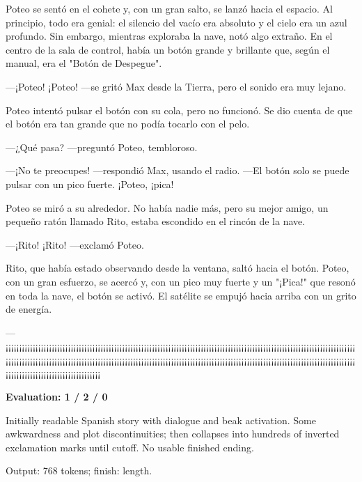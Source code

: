 \documentclass[10pt]{article}
\begin{document}
{\begin{minipage}{\textwidth}
\par\smallskip
Poteo se sentó en el cohete y, con un gran salto, se lanzó hacia el espacio. Al principio, todo era genial: el silencio del vacío era absoluto y el cielo era un azul profundo. Sin embargo, mientras exploraba la nave, notó algo extraño. En el centro de la sala de control, había un botón grande y brillante que, según el manual, era el "Botón de Despegue".
\par\smallskip
—¡Poteo! ¡Poteo! —se gritó Max desde la Tierra, pero el sonido era muy lejano.
\par\smallskip
Poteo intentó pulsar el botón con su cola, pero no funcionó. Se dio cuenta de que el botón era tan grande que no podía tocarlo con el pelo.
\par\smallskip
—¿Qué pasa? —preguntó Poteo, tembloroso.
\par\smallskip
—¡No te preocupes! —respondió Max, usando el radio. —El botón solo se puede pulsar con un pico fuerte. ¡Poteo, ¡pica!
\par\smallskip
Poteo se miró a su alrededor. No había nadie más, pero su mejor amigo, un pequeño ratón llamado Rito, estaba escondido en el rincón de la nave.
\par\smallskip
—¡Rito! ¡Rito! —exclamó Poteo.
\par\smallskip
Rito, que había estado observando desde la ventana, saltó hacia el botón. Poteo, con un gran esfuerzo, se acercó y, con un pico muy fuerte y un "¡Pica!" que resonó en toda la nave, el botón se activó. El satélite se empujó hacia arriba con un grito de energía.
\par\smallskip
—¡¡¡¡¡¡¡¡¡¡¡¡¡¡¡\allowbreak{}¡¡¡¡¡¡¡¡¡¡¡¡¡¡¡¡\allowbreak{}¡¡¡¡¡¡¡¡¡¡¡¡¡¡¡¡\allowbreak{}¡¡¡¡¡¡¡¡¡¡¡¡¡¡¡¡\allowbreak{}¡¡¡¡¡¡¡¡¡¡¡¡¡¡¡¡\allowbreak{}¡¡¡¡¡¡¡¡¡¡¡¡¡¡¡¡\allowbreak{}¡¡¡¡¡¡¡¡¡¡¡¡¡¡¡¡\allowbreak{}¡¡¡¡¡¡¡¡¡¡¡¡¡¡¡¡\allowbreak{}¡¡¡¡¡¡¡¡¡¡¡¡¡¡¡¡\allowbreak{}¡¡¡¡¡¡¡¡¡¡¡¡¡¡¡¡\allowbreak{}¡¡¡¡¡¡¡¡¡¡¡¡¡¡¡¡\allowbreak{}¡¡¡¡¡¡¡¡¡¡¡¡¡¡¡¡\allowbreak{}¡¡¡¡¡¡¡¡¡¡¡¡¡¡¡¡\allowbreak{}¡¡¡¡¡¡¡¡¡¡¡¡¡¡¡¡\allowbreak{}¡¡¡¡¡¡¡¡¡¡¡¡¡¡¡¡\allowbreak{}¡¡¡¡¡¡¡¡¡¡¡¡¡¡¡¡\allowbreak{}¡¡¡¡¡¡¡¡¡¡¡¡¡¡¡¡\allowbreak{}¡¡¡¡¡¡¡¡¡¡¡¡¡¡¡¡\allowbreak{}¡¡¡¡¡¡\par\smallskip
\textbf{Evaluation: 1 / 2 / 0}\par Initially readable Spanish story with dialogue and beak activation. Some awkwardness and plot discontinuities; then collapses into hundreds of inverted exclamation marks until cutoff. No usable finished ending.
\par {\color{gray} Output: 768 tokens; finish: length.}\par

\end{minipage}}
\end{document}

